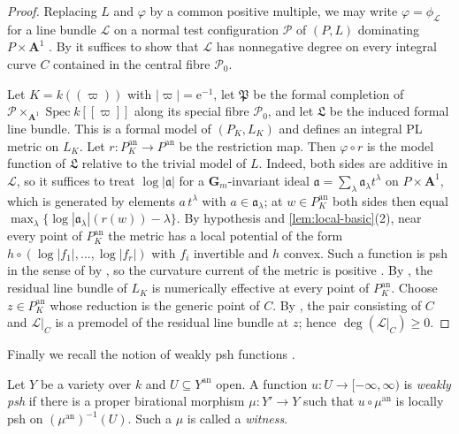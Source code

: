 \documentclass[11pt,a4paper]{article}
\newcommand{\an}{\mathrm{an}}          %
\begin{document}
\begin{proof}
Replacing $L$ and $\varphi$ by a common positive multiple, we may write $\varphi=\phi_{\mathcal L}$ for a line bundle $\mathcal L$ on a normal test configuration $\mathcal P$ of $(P,L)$ dominating $P\times\mathbf A^1$ \cite[Theorem~2.31]{BJ22}. By \cite[Definition~3.2 and Lemma~4.3]{BJ22} it suffices to show that $\mathcal L$ has nonnegative degree on every integral curve $C$ contained in the central fibre $\mathcal P_0$.

Let $K=k((\varpi))$ with $|\varpi|=\mathrm e^{-1}$, let $\mathfrak P$ be the formal completion of $\mathcal P\times_{\mathbf A^1}\operatorname{Spec}k[[\varpi]]$ along its special fibre $\mathcal P_0$, and let $\mathfrak L$ be the induced formal line bundle. This is a formal model of $(P_K,L_K)$ and defines an integral PL metric on $L_K$. Let $r\colon P_K^{\an}\to P^{\an}$ be the restriction map. Then $\varphi\circ r$ is the model function of $\mathfrak L$ relative to the trivial model of $L$. Indeed, both sides are additive in $\mathcal L$, so it suffices to treat $\log|\mathfrak a|$ for a $\mathbf G_m$-invariant ideal $\mathfrak a=\sum_\lambda\mathfrak a_\lambda t^\lambda$ on $P\times\mathbf A^1$, which is generated by elements $a\,t^\lambda$ with $a\in\mathfrak a_\lambda$; at $w\in P_K^{\an}$ both sides then equal $\max_\lambda\{\log|\mathfrak a_\lambda|(r(w))-\lambda\}$. By hypothesis and \cref{lem:local-basic}(2), near every point of $P_K^{\an}$ the metric has a local potential of the form $h\circ(\log|f_1|,\ldots,\log|f_r|)$ with $f_i$ invertible and $h$ convex. Such a function is psh in the sense of \cite{CLD12} by \cite[Corollaire~18.8.9]{CLD12}, so the curvature current of the metric is positive \cite[Proposition~8.3.1]{CLD12}. By \cite[Th\'eor\`eme~18.8.4 and Corollaire~18.8.8]{CLD12}, the residual line bundle of $L_K$ is numerically effective at every point of $P_K^{\an}$. Choose $z\in P_K^{\an}$ whose reduction is the generic point of $C$. By \cite[\S17.7.9 and Lemme~17.7.10]{CLD12}, the pair consisting of $C$ and $\mathcal L|_C$ is a premodel of the residual line bundle at $z$; hence $\deg(\mathcal L|_C)\ge0$.
\end{proof}

Finally we recall the notion of weakly psh functions \cite[Definition~6.1]{Wu26}.

\begin{definition}\label{def:weakly-psh}
Let $Y$ be a variety over $k$ and $U\subseteq Y^{\an}$ open. A function $u\colon U\to[-\infty,\infty)$ is \emph{weakly psh} if there is a proper birational morphism $\mu\colon Y'\to Y$ such that $u\circ\mu^{\an}$ is locally psh on $(\mu^{\an})^{-1}(U)$. Such a $\mu$ is called a \emph{witness}.
\end{definition}
\end{document}
